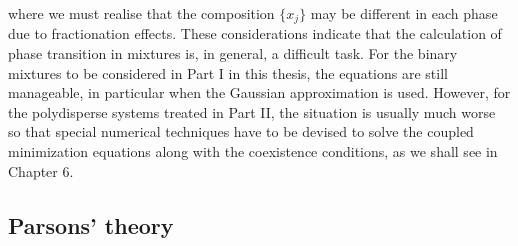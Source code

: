 \documentclass[amssymb]{revtex4}
\begin{document}
where we must realise that the composition $\{x_{j}\}$ may be different in each
phase due to fractionation effects.
These considerations indicate that the calculation of phase transition in mixtures is, 
in general, a difficult task. For the binary mixtures to be considered 
in Part I in this thesis, the equations are still manageable, in particular when 
the Gaussian approximation is used. 
However, for the polydisperse systems treated in Part II,  the situation is usually much worse so that 
special numerical techniques have to be devised to solve 
the coupled minimization equations along with the coexistence conditions, 
as we shall see in Chapter 6.



\subsection{Parsons' theory}
\end{document}
